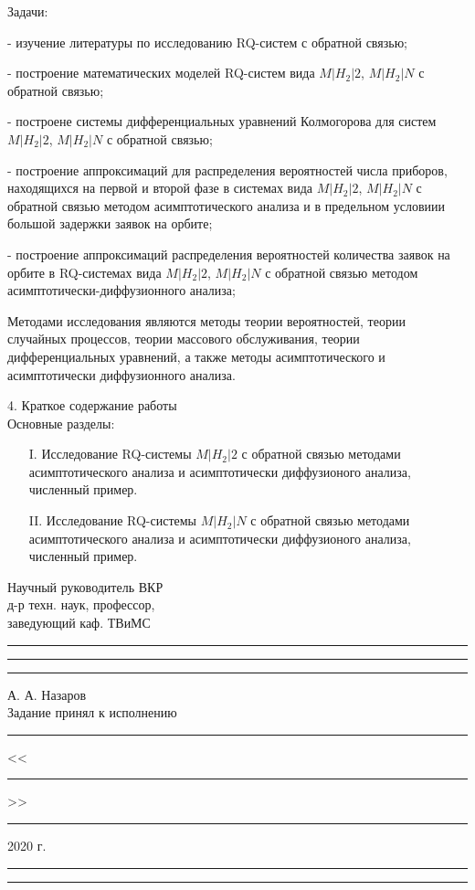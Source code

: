 Задачи:

- изучение литературы по исследованию RQ-систем с обратной связью;

- построение математических моделей RQ-систем вида $M|H_2|2$, $M|H_2|N$ с обратной связью;

- построене системы дифференциальных уравнений Колмогорова для систем $M|H_2|2$, $M|H_2|N$ с обратной связью;

- построение аппроксимаций для распределения вероятностей числа приборов, находящихся на первой и второй фазе в системах вида $M|H_2|2$, $M|H_2|N$ с обратной связью методом асимптотического анализа и в предельном условиии большой задержки заявок на орбите;

- построение аппроксимаций распределения вероятностей количества заявок на орбите в RQ-системах вида $M|H_2|2$, $M|H_2|N$ с обратной связью методом асимптотически-диффузионного анализа;

Методами исследования являются методы теории вероятностей, теории случайных процессов, теории массового обслуживания, теории дифференциальных уравнений, а также методы асимптотического и асимптотически диффузионного анализа.

\thispagestyle{empty}
4. Краткое содержание работы\\
\hspace*{\parindent}%
Основные разделы:
\begin{itemize}
	\item[I.] Исследование RQ-системы $M|H_2|2$ с обратной связью методами асимптотического анализа и асимптотически диффузионого анализа, численный пример.
	\item[II.] Исследование RQ-системы $M|H_2|N$ с обратной связью методами асимптотического анализа и асимптотически диффузионого анализа, численный пример.
\end{itemize}


\noindent Научный руководитель ВКР\\
\noindent д-р техн. наук, профессор,\\
\noindent заведующий каф. ТВиМС\rule{30mm}{0pt}\rule{30mm}{0.4pt}\rule{30mm}{0pt} А. А. Назаров\\

\noindent Задание принял к исполнению\rule{10mm}{0pt}<<\rule{10mm}{0.4pt}>>\rule{25mm}{0.4pt} 2020 г.\rule{10mm}{0pt}\rule{23mm}{0.4pt}\\
